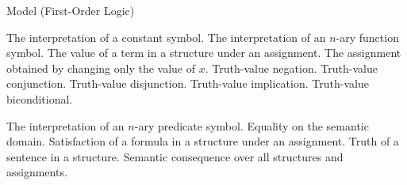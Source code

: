 \begin{modelbox}{Model (First-Order Logic)}
\begin{model}
\begin{modelfunctions}
    {The interpretation of a constant symbol.}
    {The interpretation of an \(n\)-ary function symbol.}
    {The value of a term in a structure under an assignment.}
    {The assignment obtained by changing only the value of \(x\).}
    {Truth-value negation.}
    {Truth-value conjunction.}
    {Truth-value disjunction.}
    {Truth-value implication.}
    {Truth-value biconditional.}
\end{modelfunctions}

\begin{modelrelations}
    {The interpretation of an \(n\)-ary predicate symbol.}
    {Equality on the semantic domain.}
    {Satisfaction of a formula in a structure under an assignment.}
    {Truth of a sentence in a structure.}
  \modelrelation{\models}{\Gamma\models\varphi}
    {Semantic consequence over all structures and assignments.}
\end{modelrelations}

\begin{modelsemantics}
\end{modelsemantics}


\end{model}
\end{modelbox}
